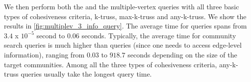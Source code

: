 We then perform both the \toplevelprob{} and the \bottomlevelprob{} multiple-vertex queries with all three basic types of cohesiveness criteria, \ie k-truss, max-k-truss and any-k-truss. We show the results in \autoref{fig:multiplev_3_info_query}. The average time for \toplevelprob{} queries spans from $3.4$ x $10^{-5}$ second to $0.06$ seconds. Typically, the average time for community search queries is much higher than \toplevelprob{} queries (since one needs to access edge-level information), ranging from $0.03$ to $918.7$ seconds depending on the size of the target communities. Among all the three types of cohesiveness criteria, any-k-truss \bottomlevelprob{} queries usually take the longest query time. %

